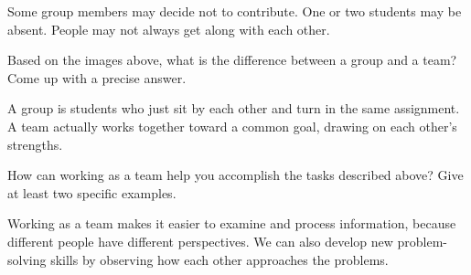 \begin{answer}
Some group members may decide not to contribute.
One or two students may be absent.
People may not always get along with each other.
\end{answer}


\Q Based on the images above, what is the difference between a group and a team?
Come up with a precise answer.

\begin{answer}
A group is students who just sit by each other and turn in the same assignment.
A team actually works together toward a common goal, drawing on each other's strengths.
\end{answer}


\Q How can working as a team help you accomplish the tasks described above?
Give at least two specific examples.

\begin{answer}
Working as a team makes it easier to examine and process information, because different people have different perspectives.
We can also develop new problem-solving skills by observing how each other approaches the problems.
\end{answer}
